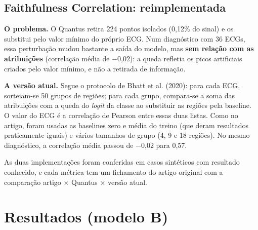 \documentclass[11pt,a4paper]{article}
\begin{document}
\subsection{Faithfulness Correlation: reimplementada}
\textbf{O problema.} O Quantus retira 224 pontos isolados (0,12\% do sinal) e os substitui pelo valor mínimo do próprio ECG. Num diagnóstico com 36 ECGs, essa perturbação mudou bastante a saída do modelo, mas \textbf{sem relação com as atribuições} (correlação média de $-$0,02): a queda refletia os picos artificiais criados pelo valor mínimo, e não a retirada de informação.

\textbf{A versão atual.} Segue o protocolo de Bhatt et al. (2020): para cada ECG, sorteiam-se 50 grupos de regiões; para cada grupo, compara-se a soma das atribuições com a queda do \textit{logit} da classe ao substituir as regiões pela baseline. O valor do ECG é a correlação de Pearson entre essas duas listas. Como no artigo, foram usadas as baselines zero e média do treino (que deram resultados praticamente iguais) e vários tamanhos de grupo (4, 9 e 18 regiões). No mesmo diagnóstico, a correlação média passou de $-$0,02 para 0,57.

As duas implementações foram conferidas em casos sintéticos com resultado conhecido, e cada métrica tem um fichamento do artigo original com a comparação artigo × Quantus × versão atual.

\section{Resultados (modelo B)}
\end{document}
